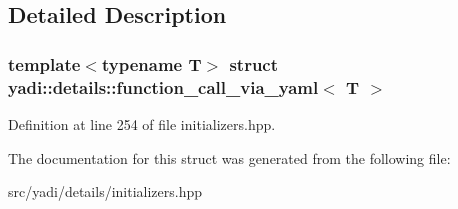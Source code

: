 \subsection{Detailed Description}
\subsubsection*{template$<$typename T$>$\newline
struct yadi\+::details\+::function\+\_\+call\+\_\+via\+\_\+yaml$<$ T $>$}



Definition at line 254 of file initializers.\+hpp.



The documentation for this struct was generated from the following file\+:\begin{DoxyCompactItemize}
\item 
src/yadi/details/initializers.\+hpp\end{DoxyCompactItemize}
